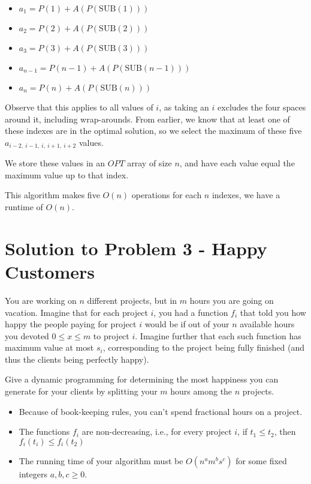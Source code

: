\documentclass[11pt]{article}
\begin{document}
\begin{itemize}
	\item $a_1 = P(1) + A(P(\text{SUB}(1)))$
	\item $a_2 = P(2) + A(P(\text{SUB}(2)))$
	\item $a_3 = P(3) + A(P(\text{SUB}(3)))$
	\item $a_{n-1} = P(n-1) + A(P(\text{SUB}(n-1)))$
	\item $a_n = P(n) + A(P(\text{SUB}(n)))$
\end{itemize}

Observe that this applies to all values of $i$, as taking an $i$ excludes the four spaces around it, including wrap-arounds. From earlier, we know that at least one of these indexes are in the optimal solution, so we select the maximum of these five $a_{i-2,\ i-1,\ i,\ i+1,\ i+2}$ values.

We store these values in an $OPT$ array of size $n$, and have each value equal the maximum value up to that index.

This algorithm makes five $O(n)$ operations for each $n$ indexes, we have a runtime of $O(n)$.
\pagebreak

\section*{Solution to Problem 3 - Happy Customers}

You are working on $n$ different projects, but in $m$ hours you are going on vacation. Imagine that for each project $i$, you had a function $f_i$ that told you how happy the people paying for project $i$ would be if out of your $n$ available hours you devoted $0 \leq x \leq m$ to project $i$. Imagine further that each such function has maximum value at most $s_i$, corresponding to the project being fully finished (and thus the clients being perfectly happy).

Give a dynamic programming for determining the most happiness you can generate for your clients by splitting your $m$ hours among the $n$ projects.

\begin{itemize}
\item Because of book-keeping rules, you can't spend fractional hours on a project.
\item The functions $f_i$ are non-decreasing, i.e., for every project $i$, if $t_1 \leq t_2$, then $f_i(t_i) \leq f_i(t_2)$
\item The running time of your algorithm must be $O(n^am^bs^c)$ for some fixed integers $a, b, c \geq 0$.
\end{itemize}
\end{document}
